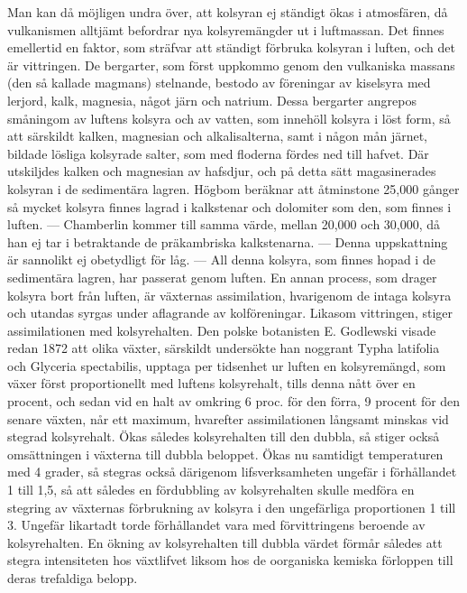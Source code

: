 \documentclass[a4paper, 12pt, oneside, swedish]{article}
\begin{document}
Man kan då möjligen undra över, att kolsyran ej ständigt ökas i atmosfären, då vulkanismen alltjämt befordrar nya kolsyremängder ut i luftmassan. Det finnes emellertid en faktor, som sträfvar att ständigt förbruka kolsyran i luften, och det är vittringen. De bergarter, som först uppkommo genom den vulkaniska massans (den så kallade magmans) stelnande, bestodo av föreningar av kiselsyra med lerjord, kalk, magnesia, något järn och natrium. Dessa bergarter angrepos småningom av luftens kolsyra och av vatten, som innehöll kolsyra i löst form, så att särskildt kalken, magnesian och alkalisalterna, samt i någon mån järnet, bildade lösliga kolsyrade salter, som med floderna fördes ned till hafvet. Där utskiljdes kalken och magnesian av hafsdjur, och på detta sätt magasinerades kolsyran i de sedimentära lagren. Högbom beräknar att åtminstone 25,000 gånger så mycket kolsyra finnes lagrad i kalkstenar och dolomiter som den, som finnes i luften. --- Chamberlin kommer till samma värde, mellan 20,000 och 30,000, då han ej tar i betraktande de präkambriska kalkstenarna. --- Denna uppskattning är sannolikt ej obetydligt för låg. --- All denna kolsyra, som finnes hopad i de sedimentära lagren, har passerat genom luften. En annan process, som drager kolsyra bort från luften, är växternas assimilation, hvarigenom de intaga kolsyra och utandas syrgas under aflagrande av kolföreningar. Likasom vittringen, stiger assimilationen med kolsyrehalten. Den polske botanisten E. Godlewski visade redan 1872 att olika växter, särskildt undersökte han noggrant Typha latifolia och Glyceria spectabilis, upptaga per tidsenhet ur luften en kolsyremängd, som växer först proportionellt med luftens kolsyrehalt, tills denna nått över en procent, och sedan vid en halt av omkring 6 proc. för den förra, 9 procent för den senare växten, når ett maximum, hvarefter assimilationen långsamt minskas vid stegrad kolsyrehalt. Ökas således kolsyrehalten till den dubbla, så stiger också omsättningen i växterna till dubbla beloppet. Ökas nu samtidigt temperaturen med 4 grader, så stegras också därigenom lifsverksamheten ungefär i förhållandet 1 till 1,5, så att således en fördubbling av kolsyrehalten skulle medföra en stegring av växternas förbrukning av kolsyra i den ungefärliga proportionen 1 till 3. Ungefär likartadt torde förhållandet vara med förvittringens beroende av kolsyrehalten. En ökning av kolsyrehalten till dubbla värdet förmår således att stegra intensiteten hos växtlifvet liksom hos de oorganiska kemiska förloppen till deras trefaldiga belopp.
\end{document}
